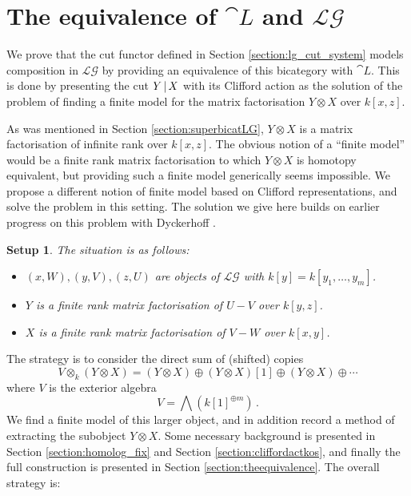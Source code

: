 \documentclass[english,letter paper,12pt,leqno]{article}
\newtheorem{setup}[theorem]{Setup}
\theoremstyle{example}
\numberwithin{equation}{section}
\def\LG{\mathcal{LG}}
\begin{document}
\section{The equivalence of $\cat{L}$ and $\LG$}

We prove that the cut functor defined in Section \ref{section:lg_cut_system} models composition in $\LG$ by providing an equivalence of this bicategory with $\cat{L}$. This is done by presenting the cut $Y \,|\, X$ with its Clifford action as the solution of the problem of finding a finite model for the matrix factorisation $Y \otimes X$ over $k[x,z]$.

As was mentioned in Section \ref{section:superbicatLG}, $Y \otimes X$ is a matrix factorisation of infinite rank over $k[x,z]$. The obvious notion of a ``finite model'' would be a finite rank matrix factorisation to which $Y \otimes X$ is homotopy equivalent, but providing such a finite model generically seems impossible. We propose a different notion of finite model based on Clifford representations, and solve the problem in this setting. The solution we give here builds on earlier progress on this problem with Dyckerhoff \cite{dm1102.2957}. 

\begin{setup}\label{setupforfusion} The situation is as follows:
\begin{itemize}
\item $(x,W), (y, V), (z,U)$ are objects of $\LG$ with $k[y] = k[y_1,\ldots,y_m]$.
\item $Y$ is a finite rank matrix factorisation of $U - V$ over $k[y,z]$.
\item $X$ is a finite rank matrix factorisation of $V - W$ over $k[x,y]$.
\end{itemize}
\end{setup}

The strategy is to consider the direct sum of (shifted) copies
\begin{equation}\label{eq:larger_object}
V \otimes_k ( Y \otimes X ) = (Y \otimes X) \oplus (Y \otimes X)[1] \oplus (Y \otimes X) \oplus \cdots
\end{equation}
where $V$ is the exterior algebra
\[
V = \bigwedge( k[1]^{\oplus m} )\,.
\]
We find a finite model of this larger object, and in addition record a method of extracting the subobject $Y \otimes X$. Some necessary background is presented in Section \ref{section:homolog_fix} and Section \ref{section:cliffordactkos}, and finally the full construction is presented in Section \ref{section:theequivalence}. The overall strategy is:
\end{document}
